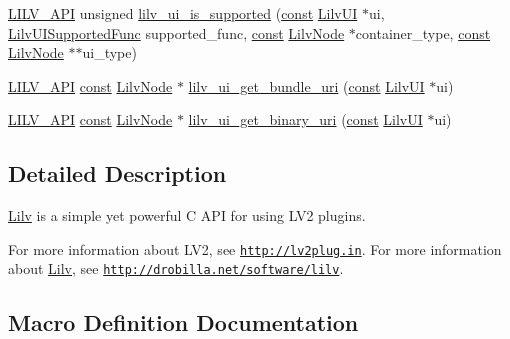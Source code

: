 \begin{DoxyCompactItemize}
\item 
\hyperlink{lilv_8h_aa5182eee7ddff96862d0171967ee6f77}{L\+I\+L\+V\+\_\+\+A\+PI} unsigned \hyperlink{group__lilv_ga4424197618e4ccac17b7006e54753cdd}{lilv\+\_\+ui\+\_\+is\+\_\+supported} (\hyperlink{getopt1_8c_a2c212835823e3c54a8ab6d95c652660e}{const} \hyperlink{lilv_8h_a42d32f453a79ab1c944daa6436f22dde}{Lilv\+UI} $\ast$ui, \hyperlink{group__lilv_gabe16181bb064cb9e09519d15430c0f62}{Lilv\+U\+I\+Supported\+Func} supported\+\_\+func, \hyperlink{getopt1_8c_a2c212835823e3c54a8ab6d95c652660e}{const} \hyperlink{lilv_8h_ae183dca3dca5368d34dbd863a405437b}{Lilv\+Node} $\ast$container\+\_\+type, \hyperlink{getopt1_8c_a2c212835823e3c54a8ab6d95c652660e}{const} \hyperlink{lilv_8h_ae183dca3dca5368d34dbd863a405437b}{Lilv\+Node} $\ast$$\ast$ui\+\_\+type)
\item 
\hyperlink{lilv_8h_aa5182eee7ddff96862d0171967ee6f77}{L\+I\+L\+V\+\_\+\+A\+PI} \hyperlink{getopt1_8c_a2c212835823e3c54a8ab6d95c652660e}{const} \hyperlink{lilv_8h_ae183dca3dca5368d34dbd863a405437b}{Lilv\+Node} $\ast$ \hyperlink{group__lilv_ga1f8c8224db86f61d1ec0968e85ea3f8d}{lilv\+\_\+ui\+\_\+get\+\_\+bundle\+\_\+uri} (\hyperlink{getopt1_8c_a2c212835823e3c54a8ab6d95c652660e}{const} \hyperlink{lilv_8h_a42d32f453a79ab1c944daa6436f22dde}{Lilv\+UI} $\ast$ui)
\item 
\hyperlink{lilv_8h_aa5182eee7ddff96862d0171967ee6f77}{L\+I\+L\+V\+\_\+\+A\+PI} \hyperlink{getopt1_8c_a2c212835823e3c54a8ab6d95c652660e}{const} \hyperlink{lilv_8h_ae183dca3dca5368d34dbd863a405437b}{Lilv\+Node} $\ast$ \hyperlink{group__lilv_gada80af09d7f40b543f3e7c2a0152a001}{lilv\+\_\+ui\+\_\+get\+\_\+binary\+\_\+uri} (\hyperlink{getopt1_8c_a2c212835823e3c54a8ab6d95c652660e}{const} \hyperlink{lilv_8h_a42d32f453a79ab1c944daa6436f22dde}{Lilv\+UI} $\ast$ui)
\end{DoxyCompactItemize}


\subsection{Detailed Description}
\hyperlink{namespace_lilv}{Lilv} is a simple yet powerful C A\+PI for using L\+V2 plugins.

For more information about L\+V2, see \href{http://lv2plug.in}{\tt http\+://lv2plug.\+in}. For more information about \hyperlink{namespace_lilv}{Lilv}, see \href{http://drobilla.net/software/lilv}{\tt http\+://drobilla.\+net/software/lilv}. 

\subsection{Macro Definition Documentation}
